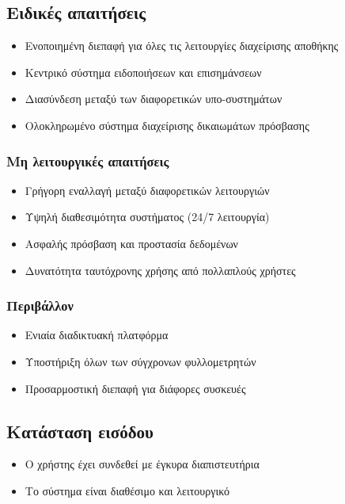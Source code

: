 \documentclass[12pt,a4paper,twoside]{book}
\begin{document}
\subsection{Ειδικές απαιτήσεις} %
\begin{itemize}
  \item Ενοποιημένη διεπαφή για όλες τις λειτουργίες διαχείρισης αποθήκης %
  \item Κεντρικό σύστημα ειδοποιήσεων και επισημάνσεων %
  \item Διασύνδεση μεταξύ των διαφορετικών υπο-συστημάτων %
  \item Ολοκληρωμένο σύστημα διαχείρισης δικαιωμάτων πρόσβασης %
\end{itemize}

\subsubsection{Μη λειτουργικές απαιτήσεις}
\begin{itemize}
  \item Γρήγορη εναλλαγή μεταξύ διαφορετικών λειτουργιών %
  \item Υψηλή διαθεσιμότητα συστήματος (24/7 λειτουργία) %
  \item Ασφαλής πρόσβαση και προστασία δεδομένων %
  \item Δυνατότητα ταυτόχρονης χρήσης από πολλαπλούς χρήστες
\end{itemize}

\subsubsection{Περιβάλλον}
\begin{itemize}
  \item Ενιαία διαδικτυακή πλατφόρμα %
  \item Υποστήριξη όλων των σύγχρονων φυλλομετρητών
  \item Προσαρμοστική διεπαφή για διάφορες συσκευές %
\end{itemize}

\subsection{Κατάσταση εισόδου} %
\begin{itemize}
  \item Ο χρήστης έχει συνδεθεί με έγκυρα διαπιστευτήρια %
  \item Το σύστημα είναι διαθέσιμο και λειτουργικό %
\end{itemize}
\end{document}
